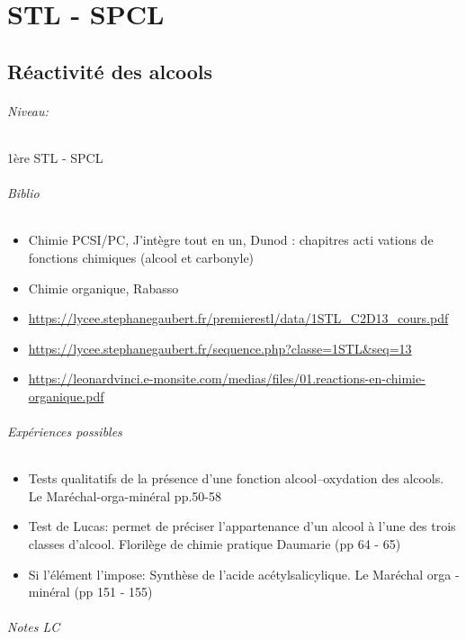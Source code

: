 \documentclass[11pt]{report}
\numberwithin{figure}{section}
\numberwithin{equation}{section}
\numberwithin{table}{section}
\newcommand{\1}{\boldsymbol{1}}
\begin{document}
\part{STL - SPCL}

\chapter{Réactivité des alcools}

\paragraph*{Niveau:} 1ère STL - SPCL

\paragraph{Biblio}
\begin{itemize}
\item Chimie PCSI/PC, J’intègre tout en un, Dunod : chapitres acti vations de fonctions chimiques (alcool et carbonyle)
\item Chimie organique, Rabasso
\item \url{https://lycee.stephanegaubert.fr/premierestl/data/1STL_C2D13_cours.pdf}
\item \url{https://lycee.stephanegaubert.fr/sequence.php?classe=1STL&seq=13}
\item \url{https://leonardvinci.e-monsite.com/medias/files/01.reactions-en-chimie-organique.pdf}
\end{itemize}

\paragraph{Expériences possibles}
\begin{itemize}
\item Tests qualitatifs de la présence d’une fonction alcool–oxydation des alcools. Le Maréchal-orga-minéral pp.50-58
\item Test de Lucas: permet de préciser l'appartenance d'un alcool à l'une des trois classes d'alcool. Florilège de chimie pratique Daumarie (pp 64 - 65)
\item Si l'élément l'impose: Synthèse de l’acide acétylsalicylique. Le Maréchal orga - minéral (pp 151 - 155)
\end{itemize}

\paragraph{Notes LC}
\end{document}
